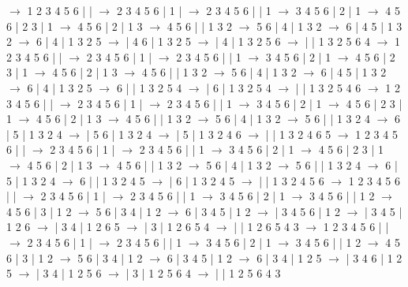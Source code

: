 \documentclass{article}
\begin{document}
\newline
 $\rightarrow$ 1 2 3 4 5 6 |  |  $\rightarrow$ 2 3 4 5 6 | 1 |  $\rightarrow$ 2 3 4 5 6 |  | 1 $\rightarrow$ 3 4 5 6 | 2 | 1 $\rightarrow$ 4 5 6 | 2 3 | 1 $\rightarrow$ 4 5 6 | 2 | 1 3 $\rightarrow$ 4 5 6 |  | 1 3 2 $\rightarrow$ 5 6 | 4 | 1 3 2 $\rightarrow$ 6 | 4 5 | 1 3 2 $\rightarrow$ 6 | 4 | 1 3 2 5 $\rightarrow$  | 4 6 | 1 3 2 5 $\rightarrow$  | 4 | 1 3 2 5 6 $\rightarrow$  |  | 1 3 2 5 6 4
\newline
 $\rightarrow$ 1 2 3 4 5 6 |  |  $\rightarrow$ 2 3 4 5 6 | 1 |  $\rightarrow$ 2 3 4 5 6 |  | 1 $\rightarrow$ 3 4 5 6 | 2 | 1 $\rightarrow$ 4 5 6 | 2 3 | 1 $\rightarrow$ 4 5 6 | 2 | 1 3 $\rightarrow$ 4 5 6 |  | 1 3 2 $\rightarrow$ 5 6 | 4 | 1 3 2 $\rightarrow$ 6 | 4 5 | 1 3 2 $\rightarrow$ 6 | 4 | 1 3 2 5 $\rightarrow$ 6 |  | 1 3 2 5 4 $\rightarrow$  | 6 | 1 3 2 5 4 $\rightarrow$  |  | 1 3 2 5 4 6
\newline
 $\rightarrow$ 1 2 3 4 5 6 |  |  $\rightarrow$ 2 3 4 5 6 | 1 |  $\rightarrow$ 2 3 4 5 6 |  | 1 $\rightarrow$ 3 4 5 6 | 2 | 1 $\rightarrow$ 4 5 6 | 2 3 | 1 $\rightarrow$ 4 5 6 | 2 | 1 3 $\rightarrow$ 4 5 6 |  | 1 3 2 $\rightarrow$ 5 6 | 4 | 1 3 2 $\rightarrow$ 5 6 |  | 1 3 2 4 $\rightarrow$ 6 | 5 | 1 3 2 4 $\rightarrow$  | 5 6 | 1 3 2 4 $\rightarrow$  | 5 | 1 3 2 4 6 $\rightarrow$  |  | 1 3 2 4 6 5
\newline
 $\rightarrow$ 1 2 3 4 5 6 |  |  $\rightarrow$ 2 3 4 5 6 | 1 |  $\rightarrow$ 2 3 4 5 6 |  | 1 $\rightarrow$ 3 4 5 6 | 2 | 1 $\rightarrow$ 4 5 6 | 2 3 | 1 $\rightarrow$ 4 5 6 | 2 | 1 3 $\rightarrow$ 4 5 6 |  | 1 3 2 $\rightarrow$ 5 6 | 4 | 1 3 2 $\rightarrow$ 5 6 |  | 1 3 2 4 $\rightarrow$ 6 | 5 | 1 3 2 4 $\rightarrow$ 6 |  | 1 3 2 4 5 $\rightarrow$  | 6 | 1 3 2 4 5 $\rightarrow$  |  | 1 3 2 4 5 6
\newline
 $\rightarrow$ 1 2 3 4 5 6 |  |  $\rightarrow$ 2 3 4 5 6 | 1 |  $\rightarrow$ 2 3 4 5 6 |  | 1 $\rightarrow$ 3 4 5 6 | 2 | 1 $\rightarrow$ 3 4 5 6 |  | 1 2 $\rightarrow$ 4 5 6 | 3 | 1 2 $\rightarrow$ 5 6 | 3 4 | 1 2 $\rightarrow$ 6 | 3 4 5 | 1 2 $\rightarrow$  | 3 4 5 6 | 1 2 $\rightarrow$  | 3 4 5 | 1 2 6 $\rightarrow$  | 3 4 | 1 2 6 5 $\rightarrow$  | 3 | 1 2 6 5 4 $\rightarrow$  |  | 1 2 6 5 4 3
\newline
 $\rightarrow$ 1 2 3 4 5 6 |  |  $\rightarrow$ 2 3 4 5 6 | 1 |  $\rightarrow$ 2 3 4 5 6 |  | 1 $\rightarrow$ 3 4 5 6 | 2 | 1 $\rightarrow$ 3 4 5 6 |  | 1 2 $\rightarrow$ 4 5 6 | 3 | 1 2 $\rightarrow$ 5 6 | 3 4 | 1 2 $\rightarrow$ 6 | 3 4 5 | 1 2 $\rightarrow$ 6 | 3 4 | 1 2 5 $\rightarrow$  | 3 4 6 | 1 2 5 $\rightarrow$  | 3 4 | 1 2 5 6 $\rightarrow$  | 3 | 1 2 5 6 4 $\rightarrow$  |  | 1 2 5 6 4 3
\end{document}
